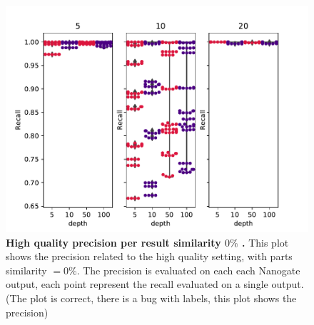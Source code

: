 \documentclass[11pt, a4paper]{article}
\begin{document}
 \begin{figure}[ht]
    \begin{center}
    \includegraphics[width=1.35\textwidth]{../results/images_notebook/v_460/hq_sim_00_precision_per_result.pdf}
    \end{center}
    \caption{{\bf High quality precision per result similarity $0\%$ .}  This plot shows the precision related to the high quality setting, with parts similarity $=0\%$. The precision is evaluated on each each Nanogate output, each point represent the recall evaluated on a single output. (The plot is correct, there is a bug with labels, this plot shows the precision)}
   \label{fig:v_460_hq_sim_00_precision_per_result}
\end{figure}
\end{document}
